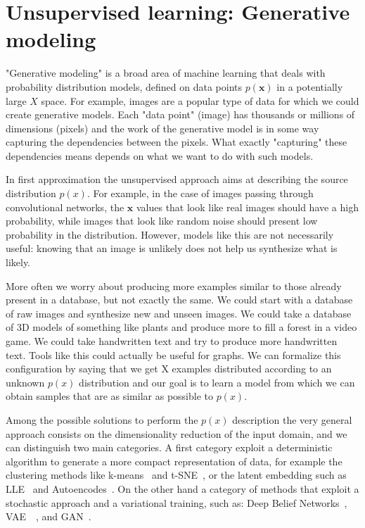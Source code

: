 \section{Unsupervised learning: Generative modeling}
%
"Generative modeling" is a broad area of machine learning that deals with probability distribution models, defined on data points $p(\bm{x})$ in a potentially large $X$ space. For example, images are a popular type of data for which we could create generative models. Each "data point" (image) has thousands or millions of dimensions (pixels) and the work of the generative model is in some way capturing the dependencies between the pixels. What exactly "capturing" these dependencies means depends on what we want to do with such models.

In first approximation the unsupervised approach aims at describing the source distribution $p(x)$.
For example, in the case of images passing through convolutional networks, the $\bm{x}$ values that look like real images should have a high probability, while images that look like random noise should present low probability in the distribution. However, models like this are not necessarily useful: knowing that an image is unlikely does not help us synthesize what is likely. 

More often we worry about producing more examples similar to those already present in a database, but not exactly the same. We could start with a database of raw images and synthesize new and unseen images. We could take a database of 3D models of something like plants and produce more to fill a forest in a video game. We could take handwritten text and try to produce more handwritten text. Tools like this could actually be useful for graphs. We can formalize this configuration by saying that we get X examples distributed according to an unknown $p(x)$ distribution and our goal is to learn a model from which we can obtain samples that are as similar as possible to $p(x)$.

Among the possible solutions to perform the $p(x)$ description the very general approach consists on the dimensionality reduction of the input domain, and we can distinguish two main categories. A first category exploit a deterministic algorithm to generate a more compact representation of data, for example the clustering methods like k-means~\cite{Kanungo00anefficient} and t-SNE~\cite{vanDerMaaten2008}, or the latent embedding such as LLE~\cite{Roweis2000} and Autoencodes~\cite{Goodfellow-et-al-2016}.
On the other hand a category of methods that exploit a stochastic approach and a variational training, such as: Deep Belief Networks~\cite{hinton_DBN}, \ac{VAE}~\cite{DBLP:journals/corr/KingmaW13}~\cite{DBLP:conf/iclr/2014}, and GAN~\cite{Goodfellow:2014:GAN:2969033.2969125}.

